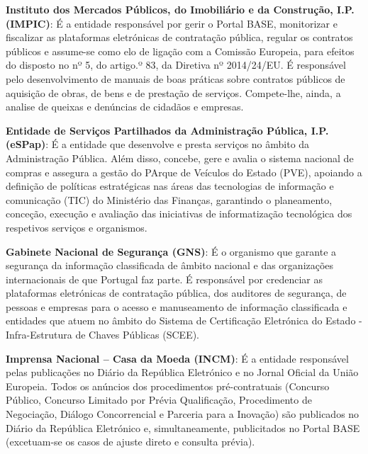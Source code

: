 \begin{my_enumerate}
	\item  \textbf{Instituto dos Mercados Públicos, do Imobiliário e da Construção, I.P. (IMPIC)}: É a entidade responsável por gerir o Portal BASE, monitorizar e fiscalizar as plataformas eletrónicas de contratação pública, regular os contratos públicos e assume-se como elo de ligação com a Comissão Europeia, para efeitos do disposto no nº 5, do artigo.º 83, da Diretiva nº 2014/24/EU. É responsável pelo desenvolvimento de manuais de boas práticas sobre contratos públicos de aquisição de obras, de bens e de prestação de serviços. Compete-lhe, ainda, a analise de queixas e denúncias de cidadãos e empresas.
	
	\item \textbf{Entidade de Serviços Partilhados da Administração Pública, I.P. (eSPap)}: É a entidade que desenvolve e presta serviços no âmbito da Administração Pública. Além disso, concebe, gere e avalia o sistema nacional de compras e assegura a gestão do PArque de Veículos do Estado (PVE), apoiando a definição de políticas estratégicas nas áreas das tecnologias de informação e comunicação (TIC) do Ministério das Finanças, garantindo o planeamento, conceção, execução e avaliação das iniciativas de informatização tecnológica dos respetivos serviços e organismos.
	
	\item \textbf{Gabinete Nacional de Segurança (GNS)}: É o organismo que garante a segurança da informação classificada de âmbito nacional e das organizações internacionais de que Portugal faz parte. É responsável por credenciar as plataformas eletrónicas de contratação pública, dos auditores de segurança, de pessoas e empresas para o acesso e manuseamento de informação classificada e entidades que atuem no âmbito do Sistema de Certificação Eletrónica do Estado - Infra-Estrutura de Chaves Públicas (SCEE).
	
	\item \textbf{Imprensa Nacional – Casa da Moeda (INCM)}: É a entidade responsável pelas publicações no Diário da República Eletrónico e no Jornal Oficial da União Europeia. Todos os anúncios dos procedimentos pré-contratuais (Concurso Público, Concurso Limitado por Prévia Qualificação, Procedimento de Negociação, Diálogo Concorrencial e Parceria para a Inovação) são publicados no Diário da República Eletrónico e, simultaneamente, publicitados no Portal BASE (excetuam-se os casos de ajuste direto e consulta prévia).
	

\end{my_enumerate}
